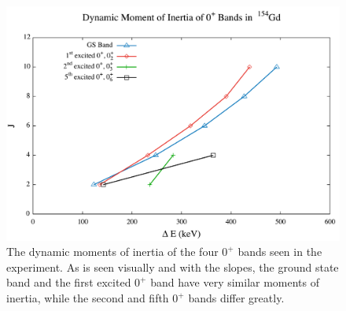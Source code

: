 \begin{figure}[!]
    \centering
    \includegraphics[scale=0.45]{Discussion/154_Dynamic0.pdf}
    \caption{The dynamic moments of inertia of the four $0^+$ bands seen in the experiment. As is seen visually and with the slopes, the ground state band and the first excited $0^+$ band have very similar moments of inertia, while the second and fifth $0^+$ bands differ greatly.}
    \label{fig:154_Dynamic0}
\end{figure}